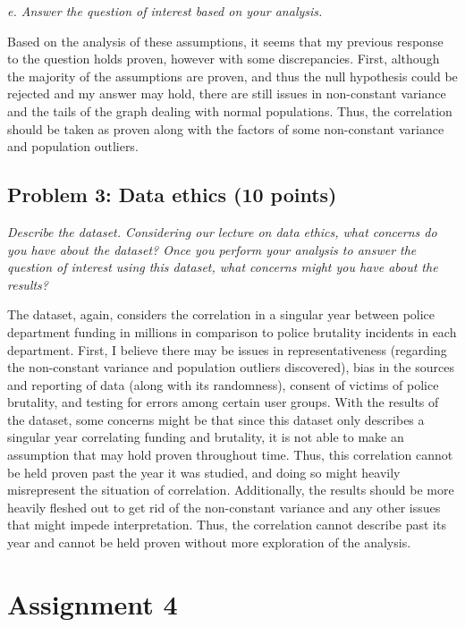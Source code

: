 \documentclass[
]{article}
\begin{document}
\emph{e. Answer the question of interest based on your analysis.}

Based on the analysis of these assumptions, it seems that my previous
response to the question holds proven, however with some discrepancies.
First, although the majority of the assumptions are proven, and thus the
null hypothesis could be rejected and my answer may hold, there are
still issues in non-constant variance and the tails of the graph dealing
with normal populations. Thus, the correlation should be taken as proven
along with the factors of some non-constant variance and population
outliers.

\hypertarget{problem-3-data-ethics-10-points}{%
\subsection{Problem 3: Data ethics (10
points)}\label{problem-3-data-ethics-10-points}}

\emph{Describe the dataset. Considering our lecture on data ethics, what
concerns do you have about the dataset? Once you perform your analysis
to answer the question of interest using this dataset, what concerns
might you have about the results?}

The dataset, again, considers the correlation in a singular year between
police department funding in millions in comparison to police brutality
incidents in each department. First, I believe there may be issues in
representativeness (regarding the non-constant variance and population
outliers discovered), bias in the sources and reporting of data (along
with its randomness), consent of victims of police brutality, and
testing for errors among certain user groups. With the results of the
dataset, some concerns might be that since this dataset only describes a
singular year correlating funding and brutality, it is not able to make
an assumption that may hold proven throughout time. Thus, this
correlation cannot be held proven past the year it was studied, and
doing so might heavily misrepresent the situation of correlation.
Additionally, the results should be more heavily fleshed out to get rid
of the non-constant variance and any other issues that might impede
interpretation. Thus, the correlation cannot describe past its year and
cannot be held proven without more exploration of the analysis.

\hypertarget{assignment-4}{%
\section{Assignment 4}\label{assignment-4}}
\end{document}
